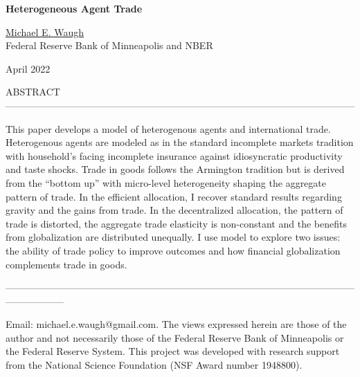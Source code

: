 \documentclass[12pt,pdftex]{article}
\begin{document}
\begin{onehalfspacing}

{\large \textbf{Heterogeneous Agent Trade}}

\vspace{1cm}

%

\href{http://www.waugheconomics.com/}{Michael E. Waugh} \\ Federal Reserve Bank of Minneapolis and NBER

\vspace{0.5cm}

April 2022

\vspace{1.5cm}


\normalsize

ABSTRACT ------------------------------------------------------------------------------------------------------------

This paper develops a model of heterogenous agents and international trade. Heterogenous agents are modeled as in the standard incomplete markets tradition with household's facing incomplete insurance against idiosyncratic productivity and taste shocks. Trade in goods follows the Armington tradition but is derived from the ``bottom up'' with micro-level heterogeneity shaping the aggregate pattern of trade. In the efficient allocation, I recover standard results regarding gravity and the gains from trade. In the decentralized allocation, the pattern of trade is distorted, the aggregate trade elasticity is non-constant and the benefits from globalization are distributed unequally. I use model to explore two issues: the ability of trade policy to improve outcomes and how financial globalization complements trade in goods.

------------------------------------------------------------------------------------------------------------------------------
%

\vspace{6.5cm}

\footnotesize Email: michael.e.waugh@gmail.com. The views expressed herein are those of the author and not necessarily those of the Federal
Reserve Bank of Minneapolis or the Federal Reserve System. This project was developed with research support from the National Science Foundation (NSF Award number 1948800).


\end{onehalfspacing}
\end{document}
